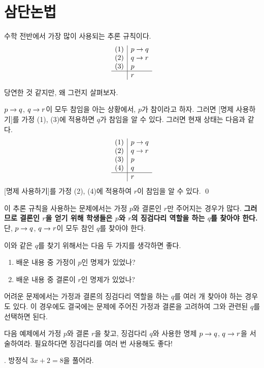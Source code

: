 \section{삼단논법}

수학 전반에서 가장 많이 사용되는 추론 규칙이다.
\[
    \begin{array}{c|l}
        (1) & p \rightarrow q \\ (2) & q \rightarrow r \\ (3) & p \\\hline & r
    \end{array}
\]

당연한 것 같지만, 왜 그런지 살펴보자.

\pf \(p \rightarrow q\), \(q \rightarrow r\)이 모두 참임을 아는 상황에서, \(p\)가 참이라고 하자. 그러면 [명제 사용하기]를 가정 (1), (3)에 적용하면 \(q\)가 참임을 알 수 있다. 그러면 현재 상태는 다음과 같다.
\[
    \begin{array}{c|l}
        (1) & p \rightarrow q \\ (2) & q \rightarrow r \\ (3) & p \\ (4) & q \\\hline & r
    \end{array}
\]
[명제 사용하기]를 가정 (2), (4)에 적용하여 \(r\)이 참임을 알 수 있다. \qed

이 추론 규칙을 사용하는 문제에서는 가정 \(p\)와 결론인 \(r\)만 주어지는 경우가 많다. \textbf{그러므로 결론인 \(r\)을 얻기 위해 학생들은 \(p\)와 \(r\)의 징검다리 역할을 하는 \(q\)를 찾아야 한다.} 단, \(p \rightarrow q\), \(q \rightarrow r\)이 모두 참인 \(q\)를 찾아야 한다.

이와 같은 \(q\)를 찾기 위해서는 다음 두 가지를 생각하면 좋다.
\begin{enumerate}
    \item 배운 내용 중 가정이 \(p\)인 명제가 있었나?
    \item 배운 내용 중 결론이 \(r\)인 명제가 있었나?
\end{enumerate}

어려운 문제에서는 가정과 결론의 징검다리 역할을 하는 \(q\)를 여러 개 찾아야 하는 경우도 있다. 이 경우에도 결국에는 문제에 주어진 가정과 결론을 고려하여 그와 관련된 \(q\)를 선택하면 된다.

\pagebreak

다음 예제에서 가정 \(p\)와 결론 \(r\)을 찾고, 징검다리 \(q\)와 사용한 명제 \(p \rightarrow q\), \(q \rightarrow r\)을 서술하여라. 필요하다면 징검다리를 여러 번 사용해도 좋다!

\ex. 방정식 \(3x + 2 = 8\)을 풀어라.


